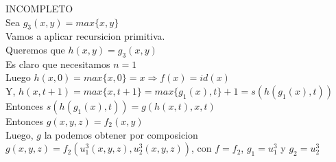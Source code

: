 \documentclass[]{article}
\begin{document}
\begin{flushleft}
	INCOMPLETO \\
	Sea $g_{3}(x,y) = max\lbrace x,y \rbrace$\linebreak
	\\Vamos a aplicar recursicion primitiva. 
	\\Queremos que $h(x,y) = g_{3}(x,y)$
	\\Es claro que necesitamos $n=1$
	\\Luego $h(x,0) = max \lbrace x, 0 \rbrace = x \Rightarrow f(x) = id(x)$
	\\Y, $h(x,t+1) = max \lbrace {x, t+1} \rbrace = max \lbrace g_{1}(x), t \rbrace + 1 = s(h(g_{1}(x),t))$
	\\Entonces 	$s(h(g_{1}(x),t)) = g(h(x,t),x,t)$
	\\Entonces $g(x,y,z) = f_{2}(x,y)$
	\\Luego, $g$ la podemos obtener por composicion $g(x,y,z)=f_{2}(u^{3}_{1}(x,y,z),u^{3}_{2}(x,y,z))$, con $f = f_{2}$, $g_{1} = u^{3}_{1}$ y $g_{2} = u^{3}_{2}$
	
\end{flushleft}
\end{document}
